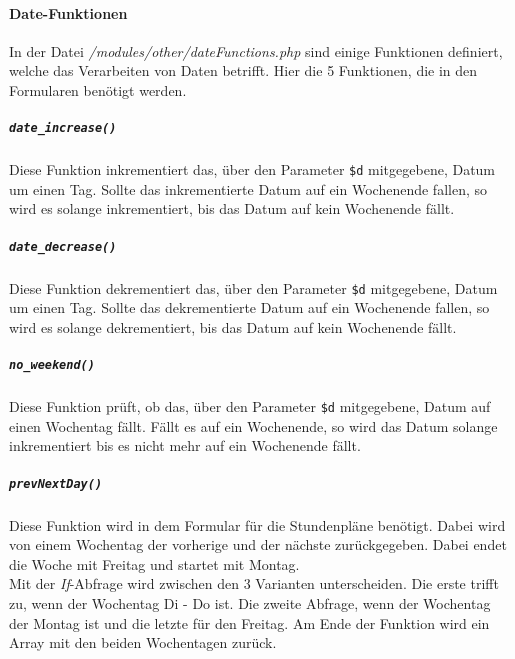 \paragraph{Date-Funktionen}
\label{sec:content_imple_date}
$ ~~ $\\
In der Datei \textit{/modules/other/dateFunctions.php} sind einige Funktionen definiert, welche das Verarbeiten von Daten betrifft. Hier die 5 Funktionen, die in den Formularen benötigt werden.\\

\subparagraph{\texttt{date\_increase()}\\}
Diese Funktion inkrementiert das, über den Parameter \texttt{\$d} mitgegebene, Datum um einen Tag. Sollte das inkrementierte Datum auf ein Wochenende fallen, so wird es solange inkrementiert, bis das Datum auf kein Wochenende fällt.



\subparagraph{\texttt{date\_decrease()}\\}
Diese Funktion dekrementiert das, über den Parameter \texttt{\$d} mitgegebene, Datum um einen Tag. Sollte das dekrementierte Datum auf ein Wochenende fallen, so wird es solange dekrementiert, bis das Datum auf kein Wochenende fällt.



\subparagraph{\texttt{no\_weekend()}\\}
Diese Funktion prüft, ob das, über den Parameter \texttt{\$d} mitgegebene, Datum  auf einen Wochentag fällt. Fällt es auf ein Wochenende, so wird das Datum solange inkrementiert bis es nicht mehr auf ein Wochenende fällt.



\subparagraph{\texttt{prevNextDay()}\\}
Diese Funktion wird in dem Formular für die Stundenpläne benötigt. Dabei wird von einem Wochentag der vorherige und der nächste zurückgegeben. Dabei endet die Woche mit Freitag und startet mit Montag.\\
Mit der \textit{If}-Abfrage wird zwischen den 3 Varianten unterscheiden. Die erste trifft zu, wenn der Wochentag Di - Do ist. Die zweite Abfrage, wenn der Wochentag der Montag ist und die letzte für den Freitag. Am Ende der Funktion wird ein Array mit den beiden Wochentagen zurück.

